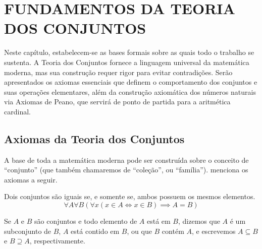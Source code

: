 
\chapter{FUNDAMENTOS DA TEORIA DOS CONJUNTOS}
\label{chap:fundamentos_teoria_conjuntos}

Neste capítulo, estabelecem-se as bases formais sobre as quais todo o trabalho se sustenta. A Teoria dos Conjuntos fornece a linguagem universal da matemática moderna, mas sua construção requer rigor para evitar contradições. Serão apresentados os axiomas essenciais que definem o comportamento dos conjuntos e suas operações elementares, além da construção axiomática dos números naturais via Axiomas de Peano, que servirá de ponto de partida para a aritmética cardinal.

\section{Axiomas da Teoria dos Conjuntos}
\label{sec:axiomas_conjuntos}

A base de toda a matemática moderna pode ser construída sobre o conceito de ``conjunto''  (que também chamaremos de ``coleção'', ou ``família''). \textcite{enderton1977} menciona os axiomas a seguir.

\begin{axioma}
    \label{ax:extensao}
    Dois conjuntos são iguais se, e somente se, ambos possuem os mesmos elementos.
    \[
        \forall A \forall B \left(\forall x(x \in A \iff x \in B) \implies A = B \right)
    \]
\end{axioma}

\begin{definicao}[Subconjunto]
    \label{def:subconjunto}
    Se \(A\) e \(B\) são conjuntos e todo elemento de \(A\) está em \(B\), dizemos que \(A\) é um subconjunto de \(B\), \(A\) está contido em \(B\), ou que \(B\) contém \(A\), e escrevemos \(A \subseteq B\) e \(B \supseteq A\), respectivamente.
\end{definicao}



